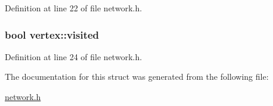 \-Definition at line 22 of file network.\-h.

\hypertarget{structvertex_a30e88e530b7a98eba97ce4667325f2b1}{
\subsubsection[{visited}]{\setlength{\rightskip}{0pt plus 5cm}bool {\bf vertex\-::visited}}}\label{structvertex_a30e88e530b7a98eba97ce4667325f2b1}


\-Definition at line 24 of file network.\-h.



\-The documentation for this struct was generated from the following file\-:\begin{DoxyCompactItemize}
\item 
\hyperlink{network_8h}{network.\-h}\end{DoxyCompactItemize}

